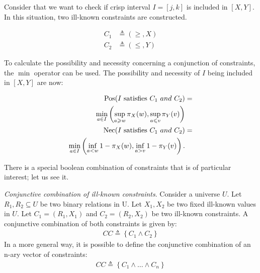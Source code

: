 \begin{example}
Consider that we want to check if crisp interval $I = \left[j, k\right]$ is included in $\left[X, Y\right]$. In this situation, two ill-known constraints are constructed.


\vspace{-10pt}

\begin{eqnarray}
C_1 & \triangleq\left(\geq,X\right)\\
C_2 & \triangleq\left(\leq,Y\right)
\end{eqnarray}

To calculate the possibility and necessity concerning a conjunction of constraints, the $\min$ operator can be used. The possibility and necessity of $I$ being included in $\left[X, Y\right]$ are now: %

\vspace{-10pt}

\begin{align}
\label{eq:interval-pos}
\operatorname{Pos}(I\text{ satisfies }C_1\ and\ C_2) & =\\
\nonumber
\min_{a \in I}\left(\sup_{a \geqslant w}\pi_{X}(w),\sup_{a \leqslant v}\pi_{Y}(v)\right)\\
\label{eq:interval-nec}
\operatorname{Nec}(I\text{ satisfies }C_1\ and\ C_2) & =\\
\nonumber
\min_{a \in I}\left(\inf_{a < w} 1-\pi_{X}(w),\inf_{a > v} 1-\pi_{Y}(v)\right).
\end{align}
\end{example}

There is a special boolean combination of constraints that is of particular interest; let us see it.
\begin{definition}
\emph{Conjunctive combination of ill-known constraints}. Consider a universe $U$. Let $R_1, R_2 \subseteq U$ be two binary relations in U. Let $X_1, X_2$ be two fixed ill-known values in $U$. Let  $C_1 = (R_1, X_1)$ and $C_2 = (R_2, X_2)$ be two ill-known constraints. A conjunctive combination of both constraints is given by:
\begin{align}
\label{eq:convex-combination}
CC \triangleq \left \lbrace C_1 \wedge C_2 \right \rbrace
\end{align}
In a more general way, it is possible to define the conjunctive combination of an n-ary vector of constraints:
\begin{align}
\label{eq:nary-convex-combination}
CC \triangleq \left \lbrace C_1 \wedge \ldots \wedge C_n \right \rbrace
\end{align}
\end{definition}

